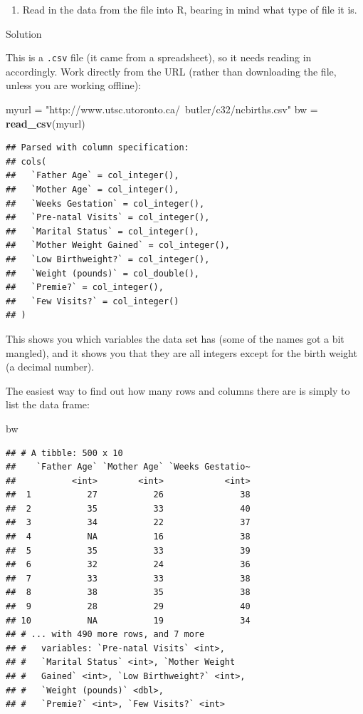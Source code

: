 \documentclass[]{tufte-book}
\newenvironment{Shaded}{}{}
\newcommand{\KeywordTok}[1]{\textcolor[rgb]{0.00,0.44,0.13}{\textbf{#1}}}
\newcommand{\NormalTok}[1]{#1}
\newcommand{\StringTok}[1]{\textcolor[rgb]{0.25,0.44,0.63}{#1}}
\providecommand{\tightlist}{%
  \setlength{\itemsep}{0pt}\setlength{\parskip}{0pt}}
\theoremstyle{definition}
\theoremstyle{definition}
\theoremstyle{definition}
\theoremstyle{remark}
\begin{document}
\begin{enumerate}
\def\labelenumi{(\alph{enumi})}
\tightlist
\item
  Read in the data from the file into R, bearing in mind what type of
  file it is.
\end{enumerate}

Solution

This is a \texttt{.csv} file (it came from a spreadsheet), so it needs
reading in accordingly. Work directly from the URL (rather than
downloading the file, unless you are working offline):

\begin{Shaded}
\begin{Highlighting}[]
\NormalTok{myurl =}\StringTok{ "http://www.utsc.utoronto.ca/~butler/c32/ncbirths.csv"}
\NormalTok{bw =}\StringTok{ }\KeywordTok{read_csv}\NormalTok{(myurl)}
\end{Highlighting}
\end{Shaded}

\begin{verbatim}
## Parsed with column specification:
## cols(
##   `Father Age` = col_integer(),
##   `Mother Age` = col_integer(),
##   `Weeks Gestation` = col_integer(),
##   `Pre-natal Visits` = col_integer(),
##   `Marital Status` = col_integer(),
##   `Mother Weight Gained` = col_integer(),
##   `Low Birthweight?` = col_integer(),
##   `Weight (pounds)` = col_double(),
##   `Premie?` = col_integer(),
##   `Few Visits?` = col_integer()
## )
\end{verbatim}

This shows you which variables the data set has (some of the names got a
bit mangled), and it shows you that they are all integers except for the
birth weight (a decimal number).

The easiest way to find out how many rows and columns there are is
simply to list the data frame:

\begin{Shaded}
\begin{Highlighting}[]
\NormalTok{bw}
\end{Highlighting}
\end{Shaded}

\begin{verbatim}
## # A tibble: 500 x 10
##    `Father Age` `Mother Age` `Weeks Gestatio~
##           <int>        <int>            <int>
##  1           27           26               38
##  2           35           33               40
##  3           34           22               37
##  4           NA           16               38
##  5           35           33               39
##  6           32           24               36
##  7           33           33               38
##  8           38           35               38
##  9           28           29               40
## 10           NA           19               34
## # ... with 490 more rows, and 7 more
## #   variables: `Pre-natal Visits` <int>,
## #   `Marital Status` <int>, `Mother Weight
## #   Gained` <int>, `Low Birthweight?` <int>,
## #   `Weight (pounds)` <dbl>,
## #   `Premie?` <int>, `Few Visits?` <int>
\end{verbatim}
\end{document}
